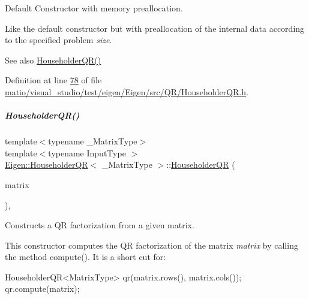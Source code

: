 Default Constructor with memory preallocation. 

Like the default constructor but with preallocation of the internal data according to the specified problem {\itshape size}. \begin{DoxySeeAlso}{See also}
\hyperlink{group___q_r___module_a974adb10a0e066057aeb3b360df68380}{Householder\+Q\+R()} 
\end{DoxySeeAlso}


Definition at line \hyperlink{matio_2visual__studio_2test_2eigen_2_eigen_2src_2_q_r_2_householder_q_r_8h_source_l00078}{78} of file \hyperlink{matio_2visual__studio_2test_2eigen_2_eigen_2src_2_q_r_2_householder_q_r_8h_source}{matio/visual\+\_\+studio/test/eigen/\+Eigen/src/\+Q\+R/\+Householder\+Q\+R.\+h}.

\mbox{\label{group___q_r___module_afa7cfb4faa89195c4dc8d196924c8230}} 
\subparagraph{\texorpdfstring{Householder\+Q\+R()}{HouseholderQR()}\hspace{0.1cm}{\footnotesize\ttfamily [7/8]}}
{\footnotesize\ttfamily template$<$typename \+\_\+\+Matrix\+Type$>$ \\
template$<$typename Input\+Type $>$ \\
\hyperlink{group___q_r___module_class_eigen_1_1_householder_q_r}{Eigen\+::\+Householder\+QR}$<$ \+\_\+\+Matrix\+Type $>$\+::\hyperlink{group___q_r___module_class_eigen_1_1_householder_q_r}{Householder\+QR} (\begin{DoxyParamCaption}\item[{const \hyperlink{group___core___module_struct_eigen_1_1_eigen_base}{Eigen\+Base}$<$ Input\+Type $>$ \&}]{matrix }\end{DoxyParamCaption})\hspace{0.3cm}{\ttfamily [inline]}, {\ttfamily [explicit]}}



Constructs a QR factorization from a given matrix. 

This constructor computes the QR factorization of the matrix {\itshape matrix} by calling the method compute(). It is a short cut for\+:


\begin{DoxyCode}
HouseholderQR<MatrixType> qr(matrix.rows(), matrix.cols());
qr.compute(matrix);
\end{DoxyCode}



